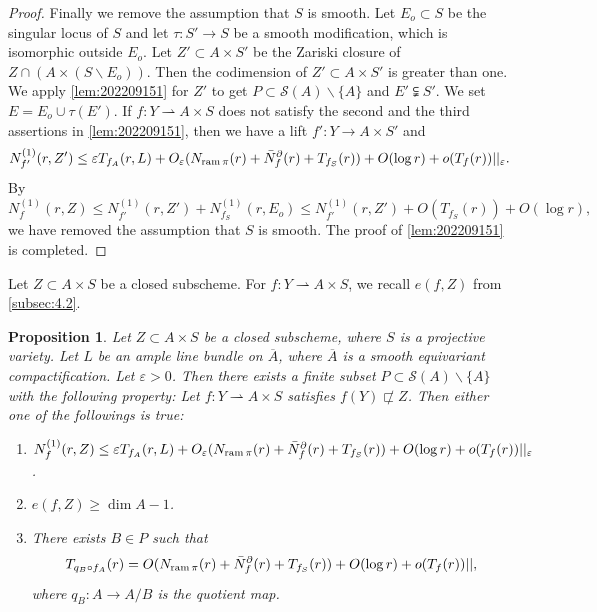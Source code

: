 \documentclass[11pt,english]{smfart}
\theoremstyle{plain}
\newtheorem{proposition}[thm]{Proposition}
\theoremstyle{definition}
\theoremstyle{remark}
\numberwithin{equation}{section}
\theoremstyle{plain}
\newcommand{\da}{\rightharpoonup}
\newcommand{\pN}[1]{\bar{N}_{#1}^{\partial}}
\newcommand{\ram}{{\rm ram}\,}
\begin{document}
\begin{proof}
		Finally we remove the assumption that $S$ is smooth.
		Let $E_o\subset S$ be the singular locus of $S$ and let $\tau:S'\to S$ be a smooth modification, which is isomorphic outside $E_o$.		Let $Z'\subset A\times S'$ be the Zariski closure of $Z\cap (A\times (S\backslash E_o))$.
		Then the codimension of $Z'\subset A\times S'$ is greater than one.
		We apply  \cref{lem:202209151} for $Z'$ to get $P\subset \mathcal{S}(A)\backslash \{A\}$ and $E'\subsetneqq S'$.
		We set $E=E_o\cup\tau(E')$.
		If $f:Y\da A\times S$ does not satisfy the second and the third assertions in \cref{lem:202209151}, then we have a lift $f':Y\to A\times S'$ and 
		$$
		N^{(1)}_{f'}(r,Z')\leq \varepsilon T_{f_A}(r,L)+O_{\varepsilon}(N_{\ram\pi}(r)+\pN{f}(r)
		+T_{f_S}(r))+O(\log r)+o(T_f(r))||_{\varepsilon}.
		$$	
		By 
		$$N^{(1)}_f(r,Z)\leq N^{(1)}_{f'}(r,Z')+N^{(1)}_{f_S}(r,E_o)\leq N^{(1)}_{f'}(r,Z')+O(T_{f_S}(r))+O(\log r),$$
		we have removed the assumption that $S$ is smooth.
		The proof of \cref{lem:202209151} is completed.		\end{proof}
	
	\medskip
	
	
	
	
	
	Let $Z\subset A\times S$ be a closed subscheme.
	For $f:Y\da A\times S$, we recall $e(f,Z)$ from \cref{subsec:4.2}.
	
	
	\begin{proposition}\label{pro:202208061}
		Let $Z\subset A\times S$ be a closed subscheme, where $S$ is a projective variety.
		Let $L$ be an ample line bundle on $\overline{A}$, where $\overline{A}$ is a smooth equivariant compactification. 	Let $\varepsilon>0$.
		Then there exists a finite subset $P\subset \mathcal{S}(A)\backslash\{A\}$ with the following property:
		Let $f:Y\da A\times S$ satisfies $f(Y)\not\sqsubset Z$.
		Then either one of the followings is true:
		\begin{enumerate}
			\item
			$
			N^{(1)}_f(r,Z)\leq \varepsilon T_{f_A}(r,L)+O_{\varepsilon}(N_{\ram\pi}(r)+\pN{f}(r)
			+T_{f_S}(r))+O(\log r)+o(T_f(r))||_{\varepsilon}$.
			\item
			$e(f,Z)\geq \dim A-1$.
			\item
			There exists $B\in P$ such that 
			$$
			T_{q_B\circ f_A}(r)=O(N_{\ram\pi}(r)+\pN{f}(r)+T_{f_S}(r))+O(\log r)+o(T_f(r))||, 
			$$
			where $q_B:A\to A/B$ is the quotient map.
		\end{enumerate}
	\end{proposition}
	
\end{document}
